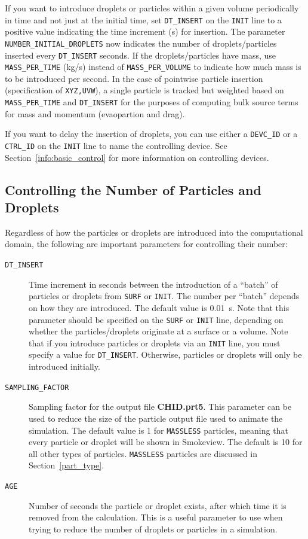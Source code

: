 \documentclass[11pt]{book}
\newcommand{\ct}{\tt\small}
\begin{document}
\noindent
If you want to introduce droplets or particles within a given volume periodically in time and not just at the initial time, set {\ct DT\_INSERT} on the {\ct INIT} line to a positive value indicating the time increment (s) for insertion. The parameter {\ct NUMBER\_INITIAL\_DROPLETS} now indicates the number of droplets/particles inserted every {\ct DT\_INSERT} seconds. If the droplets/particles have mass, use {\ct MASS\_PER\_TIME} (kg/s) instead of {\ct MASS\_PER\_VOLUME} to indicate how much mass is to be introduced per second.  In the case of pointwise particle insertion (specification of {\ct XYZ,UVW}), a single particle is tracked but weighted based on {\ct MASS\_PER\_TIME} and {\ct DT\_INSERT} for the purposes of computing bulk source terms for mass and momentum (evaopartion and drag).

If you want to delay the insertion of droplets, you can use either a {\ct DEVC\_ID} or a {\ct CTRL\_ID} on the {\ct INIT} line to name the controlling device.
See Section~\ref{info:basic_control} for more information on controlling devices.


\subsection{Controlling the Number of Particles and Droplets}
\label{info:particle_number}

Regardless of how the particles or droplets are introduced into the computational domain, the following are important
parameters for controlling their number:
\begin{description}
\item[{\ct DT\_INSERT}] Time increment in seconds between the introduction of a ``batch'' of particles or droplets from {\ct SURF}
or {\ct INIT}. The number per ``batch'' depends on how they are introduced. The default value is 0.01~s. Note that this
parameter should be specified on the {\ct SURF} or {\ct INIT} line, depending on whether the particles/droplets
originate at a surface or a volume. Note that if you introduce particles or droplets via an {\ct INIT} line,
you must specify a value for {\ct DT\_INSERT}. Otherwise, particles or droplets will only be introduced initially.
\item[{\ct SAMPLING\_FACTOR}]     Sampling factor for the output
file {\bf CHID.prt5}. This parameter can be used to reduce the size
of the particle output file used to animate the simulation. The default value is 1 for {\ct MASSLESS} particles, meaning that every particle or droplet will be shown in Smokeview. The default
is 10 for all other types of particles. {\ct MASSLESS} particles are discussed in Section~\ref{part_type}.
\item[{\ct AGE}]  Number of seconds the particle or droplet exists, after which time it is removed from the calculation. This is a useful parameter to use when
trying to reduce the number of droplets or particles in a simulation.
\end{description}
\end{document}

